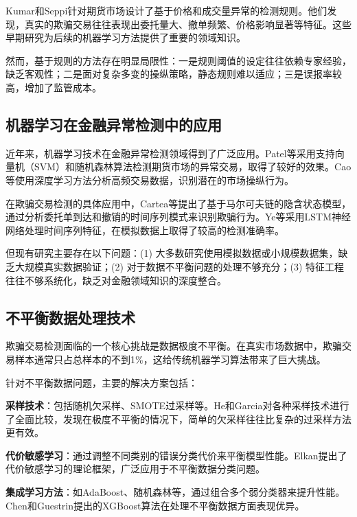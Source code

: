 \documentclass[12pt,a4paper]{article}
\begin{document}
Kumar和Seppi\cite{kumar1992futures}针对期货市场设计了基于价格和成交量异常的检测规则。他们发现，真实的欺骗交易往往表现出委托量大、撤单频繁、价格影响显著等特征。这些早期研究为后续的机器学习方法提供了重要的领域知识。

然而，基于规则的方法存在明显局限性：一是规则阈值的设定往往依赖专家经验，缺乏客观性；二是面对复杂多变的操纵策略，静态规则难以适应；三是误报率较高，增加了监管成本。

\subsection{机器学习在金融异常检测中的应用}

近年来，机器学习技术在金融异常检测领域得到了广泛应用。Patel等\cite{patel2015predicting}采用支持向量机（SVM）和随机森林算法检测期货市场的异常交易，取得了较好的效果。Cao等\cite{cao2014detecting}使用深度学习方法分析高频交易数据，识别潜在的市场操纵行为。

在欺骗交易检测的具体应用中，Cartea等\cite{cartea2018algorithmic}提出了基于马尔可夫链的隐含状态模型，通过分析委托单到达和撤销的时间序列模式来识别欺骗行为。Ye等\cite{ye2020machine}采用LSTM神经网络处理时间序列特征，在模拟数据上取得了较高的检测准确率。

但现有研究主要存在以下问题：(1) 大多数研究使用模拟数据或小规模数据集，缺乏大规模真实数据验证；(2) 对于数据不平衡问题的处理不够充分；(3) 特征工程往往不够系统化，缺乏对金融领域知识的深度整合。

\subsection{不平衡数据处理技术}

欺骗交易检测面临的一个核心挑战是数据极度不平衡。在真实市场数据中，欺骗交易样本通常只占总样本的不到1\%，这给传统机器学习算法带来了巨大挑战。

针对不平衡数据问题，主要的解决方案包括：

\textbf{采样技术}：包括随机欠采样、SMOTE过采样等。He和Garcia\cite{he2009learning}对各种采样技术进行了全面比较，发现在极度不平衡的情况下，简单的欠采样往往比复杂的过采样方法更有效。

\textbf{代价敏感学习}：通过调整不同类别的错误分类代价来平衡模型性能。Elkan\cite{elkan2001foundations}提出了代价敏感学习的理论框架，广泛应用于不平衡数据分类问题。

\textbf{集成学习方法}：如AdaBoost、随机森林等，通过组合多个弱分类器来提升性能。Chen和Guestrin\cite{chen2016xgboost}提出的XGBoost算法在处理不平衡数据方面表现优异。
\end{document}
